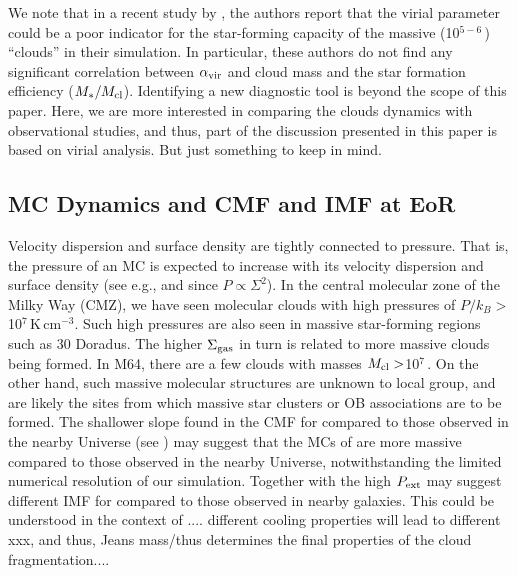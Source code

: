 \IfFileExists{emulateapjlegacy.cls}{\documentclass[iop]{emulateapjlegacy}}{\documentclass[iop]{emulateapj}}
\begin{document}
We note that in a recent study by \citet{Pettitt18a}, the authors report that the virial parameter could be a poor indicator
for the star-forming capacity of the massive (10$^{5-6}$\,\Msun) ``clouds'' in their simulation. 
In particular, these authors do not find any significant correlation between $\alpha_{\rm vir}$ and cloud mass
and the star formation efficiency ($M_*/M_{\rm cl}$).
Identifying a new diagnostic tool 
is beyond the scope of this paper. Here, we are more interested in 
comparing the clouds dynamics with observational studies, and thus, 
part of the discussion presented in this paper is based on virial analysis.
But just something to keep in mind.

\subsection{MC Dynamics and CMF and IMF at EoR}

Velocity dispersion and surface density are tightly connected to pressure. 
That is, the pressure of an MC is expected to increase with its velocity dispersion and surface density (see e.g.,  and 
since $P\propto\Sigma^2$).
In the central molecular zone of the Milky Way (CMZ), we have seen molecular clouds with high pressures of 
$P/k_B > $10$^7$\,K\,cm$^{-3}$. Such high pressures are also seen in massive star-forming regions such as 30 Doradus.
The higher $\Sigma_{\rm gas}$ in turn is related to more massive clouds being formed.
In M64, there are a few clouds with masses $M_{\rm cl}>$10$^7$\,\Msun. 
On the other hand, such massive molecular structures are unknown to local group, and are likely the sites 
from which massive star clusters or OB associations are to be formed.
% 
The shallower slope found in the CMF for \flower compared to those observed in the nearby Universe (see ) may
suggest that the MCs of \flower are more massive compared to those observed in the nearby Universe,
notwithstanding the limited numerical resolution of our simulation.
Together with the high $P_{\rm ext}$ may suggest different IMF for \flower compared to those observed in nearby galaxies.
This could be understood in the context of .... different cooling properties will lead to different xxx, and thus, Jeans mass/thus determines the final properties of the cloud fragmentation....  
\end{document}
